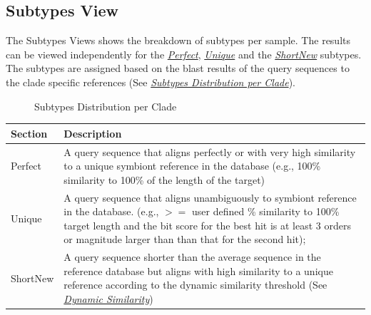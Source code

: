 \documentclass[letterpaper,10pt,english]{sphinxmanual}
\begin{document}
\subsection{Subtypes View}
\label{Web:subtypes-view}
The Subtypes Views shows the breakdown of subtypes per sample. The results
can be viewed independently for the {\hyperref[defs:perfect]{\emph{Perfect}}}, {\hyperref[defs:unique]{\emph{Unique}}} and the
{\hyperref[defs:shortnew]{\emph{ShortNew}}} subtypes. The subtypes are assigned based on the blast results of the query sequences to
the clade specific references (See {\hyperref[Web:subtype-view]{\emph{Subtypes Distribution per Clade}}}).
\begin{figure}[htbp]
\centering
\capstart

\caption{Subtypes Distribution per Clade}\label{Web:subtype-view}\end{figure}

\begin{tabulary}{\linewidth}{|p{2cm}|p{13cm}|}
\hline
\textsf{\relax 
Section
} & \textsf{\relax 
Description
}\\
\hline
Perfect
 & 
A query sequence that aligns perfectly or with very high similarity to a unique symbiont reference in the database (e.g., 100\% similarity to 100\% of the length of the target)
\\

Unique
 & 
A query sequence that aligns unambiguously to symbiont reference in the database. (e.g., \(>=\) user defined \% similarity to 100\% target length and the bit score for the best hit is at least 3 orders or magnitude larger than than that for the second hit);
\\

ShortNew
 & 
A query sequence shorter than the average sequence in the reference database but aligns with high similarity to a unique reference according to the dynamic similarity threshold (See {\hyperref[defs:dynamic-similarity]{\emph{Dynamic Similarity}}})
\\
\hline\end{tabulary}
\end{document}
